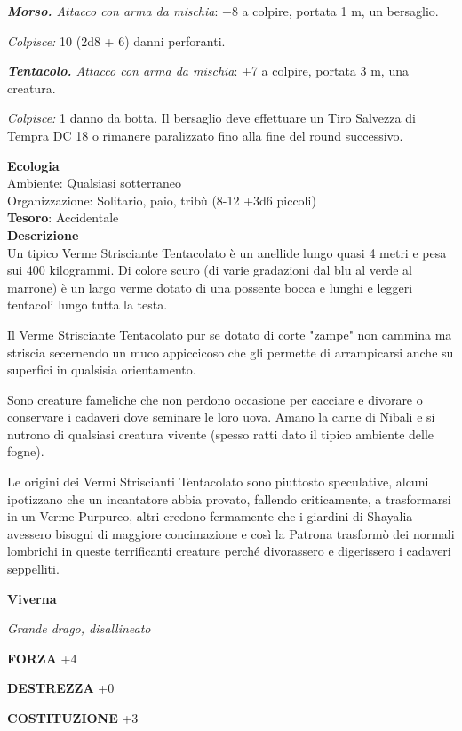 \begin{multicols}{2}
\textit{\textbf{Morso.} Attacco con arma da mischia}: +8 a colpire, portata 1 m, un bersaglio.

\textit{Colpisce:} 10 (2d8 + 6) danni perforanti.

\textit{\textbf{Tentacolo.} Attacco con arma da mischia}: +7 a colpire, portata 3 m, una creatura.

\textit{Colpisce:} 1 danno da botta. Il bersaglio deve effettuare un Tiro Salvezza di Tempra DC 18 o rimanere paralizzato fino alla fine del round successivo.

\textbf{Ecologia}\\
Ambiente: Qualsiasi sotterraneo\\
Organizzazione: Solitario, paio, tribù (8-12 +3d6 piccoli)\\
\textbf{Tesoro}: Accidentale\\
\textbf{Descrizione}\\

Un tipico Verme Strisciante Tentacolato è un anellide lungo quasi 4 metri e pesa sui 400 kilogrammi. Di colore scuro (di varie gradazioni dal blu al verde al marrone) è un largo verme dotato di una possente bocca e lunghi e leggeri tentacoli lungo tutta la testa.

Il Verme Strisciante Tentacolato pur se dotato di corte "zampe" non cammina ma striscia secernendo un muco appiccicoso che gli permette di arrampicarsi anche su superfici in qualsisia orientamento.

Sono creature fameliche che non perdono occasione per cacciare e divorare o conservare i cadaveri dove seminare le loro uova. Amano la carne di Nibali e si nutrono di qualsiasi creatura vivente (spesso ratti dato il tipico ambiente delle fogne).

Le origini dei Vermi Striscianti Tentacolato sono piuttosto speculative, alcuni ipotizzano che un incantatore abbia provato, fallendo criticamente, a trasformarsi in un Verme Purpureo, altri credono fermamente che i giardini di Shayalia avessero bisogni di maggiore concimazione e così la Patrona trasformò dei normali lombrichi in queste terrificanti creature perché divorassero e digerissero i cadaveri seppelliti.

\medskip{}\textbf{Viverna}

\textit{Grande drago, disallineato}

\textbf{FORZA} +4

\textbf{DESTREZZA} +0

\textbf{COSTITUZIONE} +3


\end{multicols}
